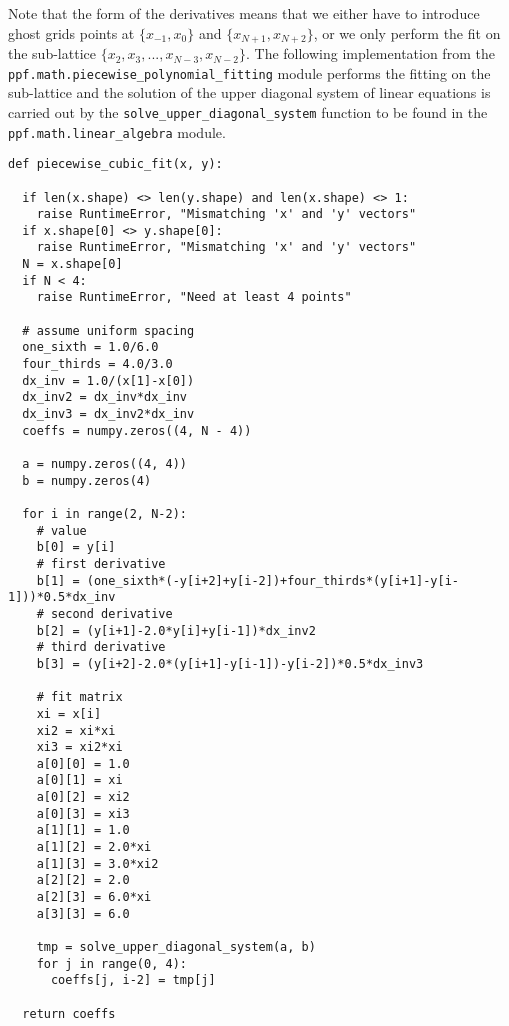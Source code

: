 Note that the form of the derivatives means that we either have to
introduce ghost grids points at $\{x_{-1},x_0\}$ and
$\{x_{N+1},x_{N+2}\}$, or we only perform the fit on the sub-lattice
$\{x_2,x_3,...,x_{N-3},x_{N-2}\}$. The following implementation from 
the \verb|ppf.math.piecewise_polynomial_fitting| module performs the 
fitting on the sub-lattice and the solution of the upper diagonal system of 
linear equations is carried out by the \verb|solve_upper_diagonal_system|
function to be found in the \verb|ppf.math.linear_algebra| module.
\begin{verbatim}
def piecewise_cubic_fit(x, y):

  if len(x.shape) <> len(y.shape) and len(x.shape) <> 1:
    raise RuntimeError, "Mismatching 'x' and 'y' vectors"
  if x.shape[0] <> y.shape[0]:
    raise RuntimeError, "Mismatching 'x' and 'y' vectors"
  N = x.shape[0]
  if N < 4:
    raise RuntimeError, "Need at least 4 points"

  # assume uniform spacing
  one_sixth = 1.0/6.0
  four_thirds = 4.0/3.0
  dx_inv = 1.0/(x[1]-x[0])
  dx_inv2 = dx_inv*dx_inv
  dx_inv3 = dx_inv2*dx_inv
  coeffs = numpy.zeros((4, N - 4))

  a = numpy.zeros((4, 4))
  b = numpy.zeros(4)

  for i in range(2, N-2):
    # value
    b[0] = y[i]
    # first derivative
    b[1] = (one_sixth*(-y[i+2]+y[i-2])+four_thirds*(y[i+1]-y[i-1]))*0.5*dx_inv
    # second derivative
    b[2] = (y[i+1]-2.0*y[i]+y[i-1])*dx_inv2
    # third derivative
    b[3] = (y[i+2]-2.0*(y[i+1]-y[i-1])-y[i-2])*0.5*dx_inv3

    # fit matrix
    xi = x[i]
    xi2 = xi*xi
    xi3 = xi2*xi
    a[0][0] = 1.0
    a[0][1] = xi
    a[0][2] = xi2
    a[0][3] = xi3
    a[1][1] = 1.0
    a[1][2] = 2.0*xi
    a[1][3] = 3.0*xi2
    a[2][2] = 2.0
    a[2][3] = 6.0*xi
    a[3][3] = 6.0

    tmp = solve_upper_diagonal_system(a, b)
    for j in range(0, 4):
      coeffs[j, i-2] = tmp[j] 

  return coeffs
\end{verbatim}

